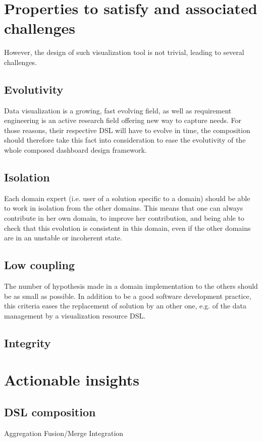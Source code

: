 \documentclass{acm_proc_article-sp}
\begin{document}
\section{Properties to satisfy and associated challenges}
However, the design of such visualization tool is not trivial, leading to several challenges.

\subsection{Evolutivity}
Data visualization is a growing, fast evolving field, as well as requirement
engineering is an active research field offering new way to capture needs.
For those reasons, their respective DSL will have to evolve in time, the
composition should therefore take this fact into consideration to ease the
evolutivity of the whole composed dashboard design framework.

\subsection{Isolation}
Each domain expert (i.e. user of a solution specific to a domain) should be able to
work in isolation from the other domains. This means that one can always contribute
in her own domain, to improve her contribution, and being able to check that
this evolution is consistent in this domain, even if the other domains are in
an unstable or incoherent state.

\subsection{Low coupling}
The number of hypothesis made in a domain implementation to the others should be
as small as possible. In addition to be a good software development practice,
this criteria eases the replacement of solution by an other one, e.g. of the
data management by a visualization resource DSL.

\subsection{Integrity}

\section{Actionable insights}
\subsection{DSL composition}

		Aggregation
		Fusion/Merge
		Integration





%

%
\end{document}
